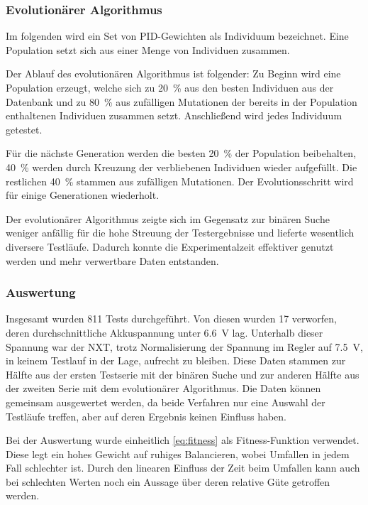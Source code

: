 \documentclass[oneside,abstractoff,a4paper]{scrartcl}
\begin{document}
\subsubsection{Evolutionärer Algorithmus}

Im folgenden wird ein Set von PID-Gewichten als Individuum bezeichnet. Eine Population setzt sich aus einer Menge von Individuen zusammen.

Der Ablauf des evolutionären Algorithmus ist folgender: Zu Beginn wird eine Population erzeugt, welche sich zu \SI{20}{\percent} aus den besten Individuen aus der Datenbank und zu \SI{80}{\percent} aus zufälligen Mutationen der bereits in der Population enthaltenen Individuen zusammen setzt. Anschließend wird jedes Individuum getestet.

Für die nächste Generation werden die besten \SI{20}{\percent} der Population beibehalten, \SI{40}{\percent} werden durch Kreuzung der verbliebenen Individuen wieder aufgefüllt. Die restlichen \SI{40}{\percent} stammen aus zufälligen Mutationen. Der Evolutionsschritt wird für einige Generationen wiederholt.

Der evolutionärer Algorithmus zeigte sich im Gegensatz zur binären Suche weniger anfällig für die hohe Streuung der Testergebnisse und lieferte wesentlich diversere Testläufe. Dadurch konnte die Experimentalzeit effektiver genutzt werden und mehr verwertbare Daten entstanden.
\subsubsection{Auswertung}
Insgesamt wurden 811 Tests durchgeführt. Von diesen wurden 17 verworfen, deren durchschnittliche Akkuspannung unter \SI{6.6}{\volt} lag. Unterhalb dieser Spannung war der NXT, trotz Normalisierung der Spannung im Regler auf \SI{7.5}{\volt}, in keinem Testlauf in der Lage, aufrecht zu bleiben.
Diese Daten stammen zur Hälfte aus der ersten Testserie mit der binären Suche und zur anderen Hälfte aus der zweiten Serie mit dem evolutionärer Algorithmus. Die Daten können gemeinsam ausgewertet werden, da beide Verfahren nur eine Auswahl der Testläufe treffen, aber auf deren Ergebnis keinen Einfluss haben.

Bei der Auswertung wurde einheitlich \cref{eq:fitness} als Fitness-Funktion verwendet. Diese legt ein hohes Gewicht auf ruhiges Balancieren, wobei Umfallen in jedem Fall schlechter ist. Durch den linearen Einfluss der Zeit beim Umfallen kann auch bei schlechten Werten noch ein Aussage über deren relative Güte getroffen werden. 
\end{document}
